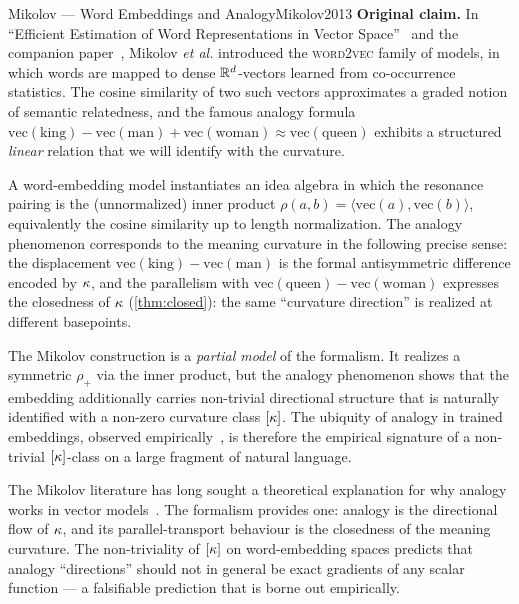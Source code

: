 \begin{zooentry}{Mikolov --- Word Embeddings and Analogy}{Mikolov2013}
\textbf{Original claim.} In ``Efficient Estimation of Word Representations
in Vector Space''~\cite{Mikolov2013} and the companion
paper~\cite{MikolovKingQueen2013}, Mikolov \emph{et al.} introduced the
\textsc{word2vec} family of models, in which words are mapped to dense
$\mathbb{R}^d$-vectors learned from co-occurrence statistics. The cosine
similarity of two such vectors approximates a graded notion of semantic
relatedness, and the famous analogy formula
$\mathrm{vec}(\text{king})-\mathrm{vec}(\text{man})+\mathrm{vec}(\text{woman})\approx
\mathrm{vec}(\text{queen})$ exhibits a structured \emph{linear} relation
that we will identify with the curvature.

\formalclaim
A word-embedding model instantiates an idea algebra in which the
resonance pairing is the (unnormalized) inner product
$\rho(a,b)=\langle\mathrm{vec}(a),\mathrm{vec}(b)\rangle$, equivalently
the cosine similarity up to length normalization. The analogy
phenomenon corresponds to the meaning curvature in the following precise
sense: the displacement $\mathrm{vec}(\text{king})-\mathrm{vec}(\text{man})$
is the formal antisymmetric difference encoded by $\kappa$, and the
parallelism with $\mathrm{vec}(\text{queen})-\mathrm{vec}(\text{woman})$
expresses the closedness of $\kappa$ (\cref{thm:closed}): the same
``curvature direction'' is realized at different basepoints.

\formalstatus
The Mikolov construction is a \emph{partial model} of the formalism. It
realizes a symmetric $\rho_+$ via the inner product, but the analogy
phenomenon shows that the embedding additionally carries
non-trivial directional structure that is naturally identified with a
non-zero curvature class $[\kappa]$. The ubiquity of analogy in trained
embeddings, observed empirically~\cite{MikolovKingQueen2013,PenningtonGloVe2014},
is therefore the empirical signature of a non-trivial $[\kappa]$-class
on a large fragment of natural language.

\litcomment
The Mikolov literature has long sought a theoretical explanation for why
analogy works in vector models~\cite{PenningtonGloVe2014,Vaswani2017}.
The formalism provides one: analogy is the directional flow of $\kappa$,
and its parallel-transport behaviour is the closedness of the meaning
curvature. The non-triviality of $[\kappa]$ on word-embedding spaces
predicts that analogy ``directions'' should not in general be exact
gradients of any scalar function --- a falsifiable prediction that is
borne out empirically.
\end{zooentry}

